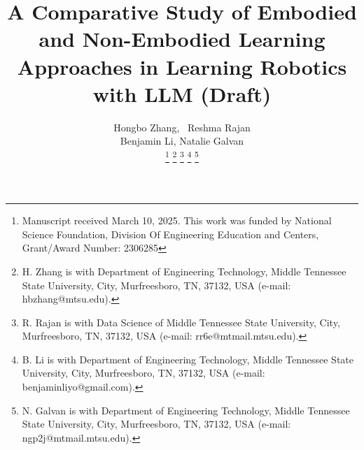     \title{A Comparative Study of Embodied and Non-Embodied Learning Approaches in Learning Robotics with LLM (Draft)}
  \author{Hongbo Zhang,~ Reshma Rajan \\
      Benjamin Li,
      Natalie Galvan%

  \thanks{Manuscript received March 10, 2025. This work was funded  by National Science Foundation, Division Of Engineering Education and Centers, Grant/Award Number: 2306285}
  \thanks{H. Zhang is with Department of Engineering Technology, Middle Tennessee State University, City, Murfreesboro, TN, 37132, USA (e-mail: hbzhang@mtsu.edu).}%
  \thanks{R. Rajan is with Data Science of Middle Tennessee State University, City, Murfreesboro, TN, 37132, USA (e-mail: rr6e@mtmail.mtsu.edu).} 
  \thanks{B. Li is with Department of Engineering Technology, Middle Tennessee State University, City, Murfreesboro, TN, 37132, USA (e-mail:
benjaminliyo@gmail.com).}%
 \thanks{N. Galvan is with Department of Engineering Technology, Middle Tennessee State University, City, Murfreesboro, TN, 37132, USA (e-mail: ngp2j@mtmail.mtsu.edu).}}




\maketitle



